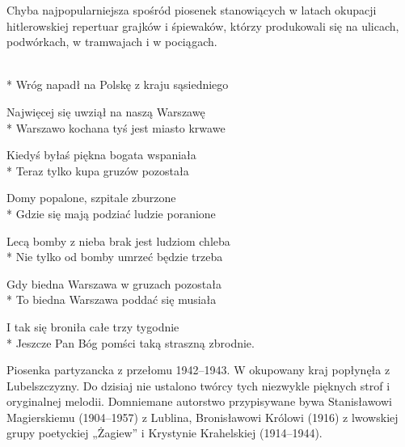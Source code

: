 \begin{info}Chyba najpopularniejsza spośród piosenek stanowiących w latach okupacji hitlerowskiej repertuar grajków i śpiewaków, którzy produkowali się na ulicach, podwórkach, w tramwajach i w pociągach. \end{info}

\begin{lyrics}[longestline={Jeszcze Pan Bóg pomści taką straszną zbrodnie.}]

\\*
Wróg napadł na Polskę z kraju sąsiedniego

Najwięcej się uwziął na naszą Warszawę\\*
Warszawo kochana tyś jest miasto krwawe

Kiedyś byłaś piękna bogata wspaniała\\*
Teraz tylko kupa gruzów pozostała

Domy popalone, szpitale zburzone\\*
Gdzie się mają podziać ludzie poranione

Lecą bomby z nieba brak jest ludziom chleba\\*
Nie tylko od bomby umrzeć będzie trzeba

Gdy biedna Warszawa w gruzach pozostała\\*
To biedna Warszawa poddać się musiała

I tak się broniła całe trzy tygodnie\\*
Jeszcze Pan Bóg pomści taką straszną zbrodnie.
\end{lyrics}



\begin{info}Piosenka partyzancka z przełomu 1942–1943. W okupowany kraj popłynęła z Lubelszczyzny. Do dzisiaj nie ustalono twórcy tych niezwykle pięknych strof i oryginalnej melodii. Domniemane autorstwo przypisywane bywa Stanisławowi Magierskiemu (1904–1957) z Lublina, Bronisławowi Królowi (1916) z lwowskiej grupy poetyckiej „Żagiew” i Krystynie Krahelskiej (1914–1944).\end{info}

